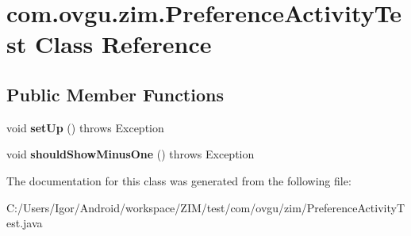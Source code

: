 \hypertarget{classcom_1_1ovgu_1_1zim_1_1_preference_activity_test}{\section{com.\-ovgu.\-zim.\-Preference\-Activity\-Test Class Reference}
\label{classcom_1_1ovgu_1_1zim_1_1_preference_activity_test}
}
\subsection*{Public Member Functions}
\begin{DoxyCompactItemize}
\item 
\hypertarget{classcom_1_1ovgu_1_1zim_1_1_preference_activity_test_a8ba5cfaab3ea11a8e7b5cb4f6a84238c}{void {\bfseries set\-Up} ()  throws Exception }\label{classcom_1_1ovgu_1_1zim_1_1_preference_activity_test_a8ba5cfaab3ea11a8e7b5cb4f6a84238c}

\item 
\hypertarget{classcom_1_1ovgu_1_1zim_1_1_preference_activity_test_a405be06b8a689ea040a9781a329c6379}{void {\bfseries should\-Show\-Minus\-One} ()  throws Exception }\label{classcom_1_1ovgu_1_1zim_1_1_preference_activity_test_a405be06b8a689ea040a9781a329c6379}

\end{DoxyCompactItemize}


The documentation for this class was generated from the following file\-:\begin{DoxyCompactItemize}
\item 
C\-:/\-Users/\-Igor/\-Android/workspace/\-Z\-I\-M/test/com/ovgu/zim/Preference\-Activity\-Test.\-java\end{DoxyCompactItemize}
